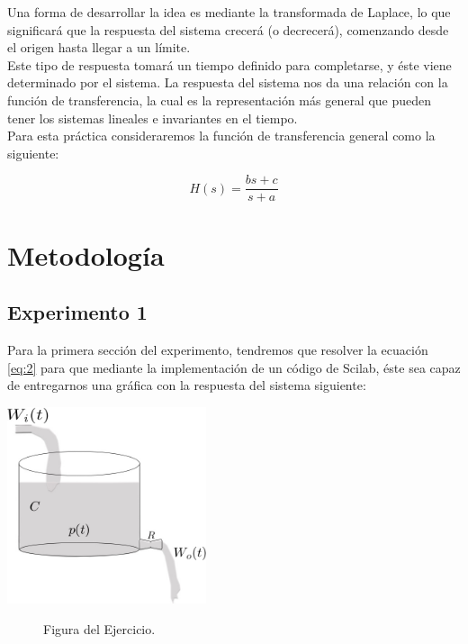 \documentclass[12pt]{article}
\begin{document}
Una forma de desarrollar la idea es mediante la transformada de Laplace, lo que significará que la respuesta del sistema crecerá (o decrecerá), comenzando desde el origen hasta llegar a un límite.\\

Este tipo de respuesta tomará un tiempo definido para completarse, y éste viene determinado por el sistema.
La respuesta del sistema nos da una relación con la función de transferencia, la cual es la representación más general que pueden tener los sistemas lineales e invariantes en el tiempo.\\

Para esta práctica consideraremos la función de transferencia general como la siguiente:

\begin{equation}
H(s)=\frac{bs+c}{s+a} \label{eq:2}
\end{equation}

\section{Metodología}
\subsection{Experimento 1}

Para la primera sección del experimento, tendremos que resolver la ecuación \eqref{eq:2} para que mediante la implementación de un código de Scilab, éste sea capaz de entregarnos una gráfica con la respuesta del sistema siguiente:\\

\begin{center}
    \includegraphics[width=2.3in]{tankScheme.jpg}
    \begin{figure}[!h]
	\caption{Figura del Ejercicio.}\label{ref:FiguraA}
	\end{figure}
\end{center}
\end{document}
